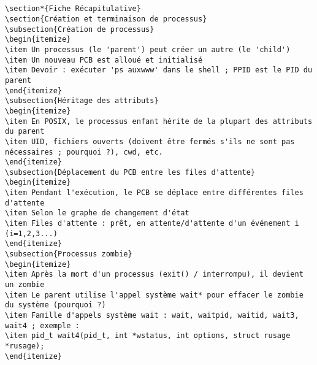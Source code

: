 \documentclass[12pt]{article}
\begin{document}
\begin{lstlisting}


\section*{Fiche Récapitulative}
\section{Création et terminaison de processus}
\subsection{Création de processus}
\begin{itemize}
\item Un processus (le 'parent') peut créer un autre (le 'child')
\item Un nouveau PCB est alloué et initialisé
\item Devoir : exécuter 'ps auxwww' dans le shell ; PPID est le PID du parent
\end{itemize}
\subsection{Héritage des attributs}
\begin{itemize}
\item En POSIX, le processus enfant hérite de la plupart des attributs du parent
\item UID, fichiers ouverts (doivent être fermés s'ils ne sont pas nécessaires ; pourquoi ?), cwd, etc.
\end{itemize}
\subsection{Déplacement du PCB entre les files d'attente}
\begin{itemize}
\item Pendant l'exécution, le PCB se déplace entre différentes files d'attente
\item Selon le graphe de changement d'état
\item Files d'attente : prêt, en attente/d'attente d'un événement i (i=1,2,3...)
\end{itemize}
\subsection{Processus zombie}
\begin{itemize}
\item Après la mort d'un processus (exit() / interrompu), il devient un zombie
\item Le parent utilise l'appel système wait* pour effacer le zombie du système (pourquoi ?)
\item Famille d'appels système wait : wait, waitpid, waitid, wait3, wait4 ; exemple :
\item pid_t wait4(pid_t, int *wstatus, int options, struct rusage *rusage);
\end{itemize}

\end{lstlisting}
\end{document}
